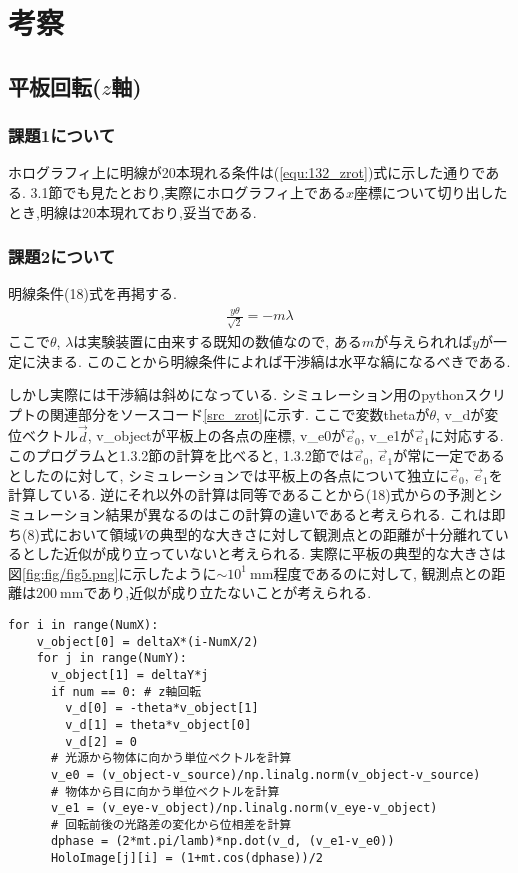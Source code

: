 \section{考察}
\subsection{平板回転($z$軸)}
\subsubsection{課題1について}
ホログラフィ上に明線が20本現れる条件は(\ref{equ:132_zrot})式に示した通りである.
3.1節でも見たとおり,実際にホログラフィ上である$x$座標について切り出したとき,明線は20本現れており,妥当である.
\subsubsection{課題2について}
明線条件(18)式を再掲する.
\begin{align*}
  \frac{y\theta}{\sqrt{2}}=-m\lambda
\end{align*}
ここで$\theta$, $\lambda$は実験装置に由来する既知の数値なので,
ある$m$が与えられれば$y$が一定に決まる.
このことから明線条件によれば干渉縞は水平な縞になるべきである.

しかし実際には干渉縞は斜めになっている.
シミュレーション用のpythonスクリプトの関連部分をソースコード\ref{src_zrot}に示す.
ここで変数thetaが$\theta$, v\_dが変位ベクトル$\vec{d}$,
v\_objectが平板上の各点の座標,
v\_e0が$\vec{e}_0$,
v\_e1が$\vec{e}_1$に対応する.
このプログラムと1.3.2節の計算を比べると,
1.3.2節では$\vec{e}_0$, $\vec{e}_1$が常に一定であるとしたのに対して,
シミュレーションでは平板上の各点について独立に$\vec{e}_0$, $\vec{e}_1$を計算している.
逆にそれ以外の計算は同等であることから(18)式からの予測とシミュレーション結果が異なるのはこの計算の違いであると考えられる.
これは即ち(8)式において領域$V$の典型的な大きさに対して観測点との距離が十分離れているとした近似が成り立っていないと考えられる.
実際に平板の典型的な大きさは図\ref{fig:fig/fig5.png}に示したように$\sim 10^1\ \si{\milli\metre}$程度であるのに対して,
観測点との距離は$200\ \si{\milli\metre}$であり,近似が成り立たないことが考えられる.
\newpage
\begin{lstlisting}[caption=$z$軸回転関連のソースコード,label=src_zrot]
  for i in range(NumX):
    v_object[0] = deltaX*(i-NumX/2)
    for j in range(NumY):
      v_object[1] = deltaY*j
      if num == 0: # z軸回転
        v_d[0] = -theta*v_object[1]
        v_d[1] = theta*v_object[0] 
        v_d[2] = 0
      # 光源から物体に向かう単位ベクトルを計算
      v_e0 = (v_object-v_source)/np.linalg.norm(v_object-v_source)  
      # 物体から目に向かう単位ベクトルを計算
      v_e1 = (v_eye-v_object)/np.linalg.norm(v_eye-v_object)        
      # 回転前後の光路差の変化から位相差を計算
      dphase = (2*mt.pi/lamb)*np.dot(v_d, (v_e1-v_e0))              
      HoloImage[j][i] = (1+mt.cos(dphase))/2
\end{lstlisting}
